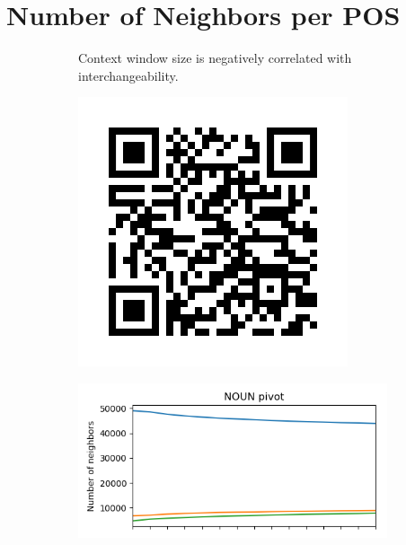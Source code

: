 \documentclass[extrafontsizes,60pt,twocolumn]{memoir}
\begin{document}
\section*{Number of Neighbors per POS}
    
    \begin{figure}[h]
        \begin{subfigure}[c]{.2\columnwidth}
        Context window size is negatively correlated with interchangeability.
        \vspace{5in}
        
        \hfill
        \includegraphics[width=.9\textwidth]{qr.png}
        \end{subfigure}
        \hspace{1in}
        \begin{subfigure}[c]{.35\columnwidth}
        \includegraphics[width=\columnwidth]{NOUN_nn_100_fasttext_enwiki-20170501-clean_cbow-300d-min500_pos.png}

\end{subfigure}
\end{figure}
\end{document}

